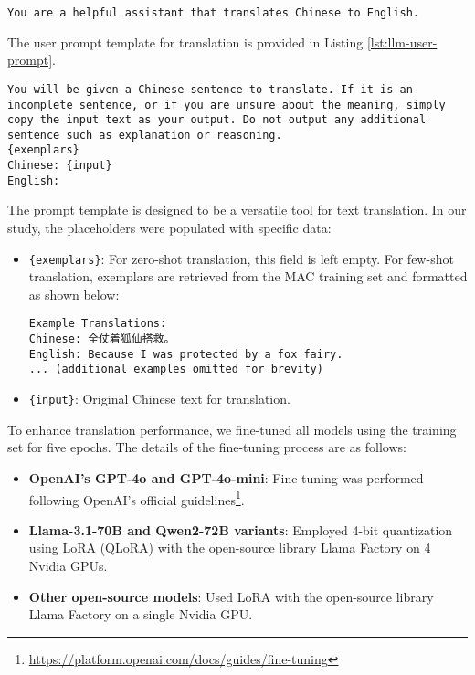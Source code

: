 \documentclass[conference]{IEEEtran}
\begin{document}
\begin{lstlisting}[caption={System Prompt for LLM Translation}, 
                   label={lst:llm-translation-prompt}, 
                   breaklines=true, 
                   basicstyle=\footnotesize\ttfamily]
You are a helpful assistant that translates Chinese to English.
\end{lstlisting}

The user prompt template for translation is provided in Listing \ref{lst:llm-user-prompt}.

\begin{lstlisting}[caption={User Prompt Template for LLM Translation}, 
                   label={lst:llm-user-prompt}, 
                   breaklines=true, 
                   basicstyle=\footnotesize\ttfamily]
You will be given a Chinese sentence to translate. If it is an incomplete sentence, or if you are unsure about the meaning, simply copy the input text as your output. Do not output any additional sentence such as explanation or reasoning.
{exemplars}
Chinese: {input}
English:
\end{lstlisting}

The prompt template is designed to be a versatile tool for text translation. In our study, the placeholders were populated with specific data:

\begin{itemize}
    \item \texttt{\{exemplars\}}: For zero-shot translation, this field is left empty. For few-shot translation, exemplars are retrieved from the MAC training set and formatted as shown below:
\begin{CJK*}{UTF8}{gbsn}
\begin{verbatim}
Example Translations:
Chinese: 全仗着狐仙搭救。
English: Because I was protected by a fox fairy.
... (additional examples omitted for brevity)
\end{verbatim}
\end{CJK*}
    \item \texttt{\{input\}}: Original Chinese text for translation.
\end{itemize}

To enhance translation performance, we fine-tuned all models using the training set for five epochs. The details of the fine-tuning process are as follows:

\begin{itemize}
    \item \textbf{OpenAI's GPT-4o and GPT-4o-mini}: Fine-tuning was performed following OpenAI's official guidelines\footnote{\url{https://platform.openai.com/docs/guides/fine-tuning}}.
    \item \textbf{Llama-3.1-70B and Qwen2-72B variants}: Employed 4-bit quantization using LoRA (QLoRA) with the open-source library Llama Factory \cite{zheng2024llamafactory} on 4 Nvidia GPUs.
    \item \textbf{Other open-source models}: Used LoRA with the open-source library Llama Factory \cite{zheng2024llamafactory} on a single Nvidia GPU.
\end{itemize}
\end{document}
